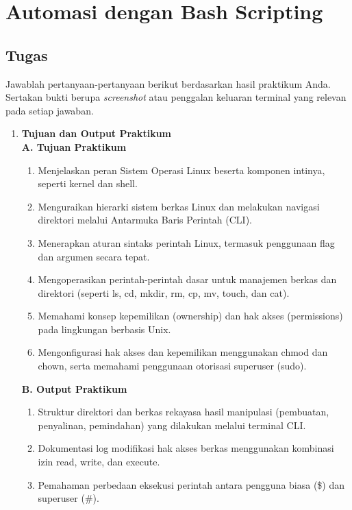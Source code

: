 
\chapter{Automasi dengan Bash Scripting}
\label{chap:handson-02}

\section{Tugas}

Jawablah pertanyaan-pertanyaan berikut berdasarkan hasil praktikum Anda.
Sertakan bukti berupa \textit{screenshot} atau penggalan keluaran terminal
yang relevan pada setiap jawaban.

\begin{enumerate}
    \item \textbf{Tujuan dan Output Praktikum}\\[0.3cm]
    \textbf{A. Tujuan Praktikum}
    \begin{enumerate}[nosep]
        \item Menjelaskan peran Sistem Operasi Linux beserta komponen intinya, seperti kernel dan shell.
        \item Menguraikan hierarki sistem berkas Linux dan melakukan navigasi direktori melalui Antarmuka Baris Perintah (CLI).
        \item Menerapkan aturan sintaks perintah Linux, termasuk penggunaan flag dan argumen secara tepat.
        \item Mengoperasikan perintah-perintah dasar untuk manajemen berkas dan direktori (seperti ls, cd, mkdir, rm, cp, mv, touch, dan cat).
        \item Memahami konsep kepemilikan (ownership) dan hak akses (permissions) pada lingkungan berbasis Unix.
        \item Mengonfigurasi hak akses dan kepemilikan menggunakan chmod dan chown, serta memahami penggunaan otorisasi superuser (sudo).
    \end{enumerate}
    \textbf{B. Output Praktikum}
    \begin{enumerate}[nosep]
        \item Struktur direktori dan berkas rekayasa hasil manipulasi (pembuatan, penyalinan, pemindahan) yang dilakukan melalui terminal CLI.
        \item Dokumentasi log modifikasi hak akses berkas menggunakan kombinasi izin read, write, dan execute.
        \item Pemahaman perbedaan eksekusi perintah antara pengguna biasa (\$) dan superuser (\#).
    \end{enumerate}
\end{enumerate}

